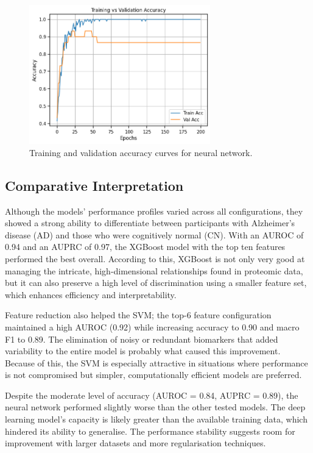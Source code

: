 \documentclass[a4paper,12pt]{article}
\begin{document}
\begin{figure}[H]
\centering
\includegraphics[width=0.70\textwidth]{Pics/nn_training_accuracy.png}
\caption{Training and validation accuracy curves for neural network.}
\label{fig:nn-training}
\end{figure}

\subsection{Comparative Interpretation}
Although the models' performance profiles varied across all configurations, they showed a strong ability to differentiate between participants with Alzheimer's disease (AD) and those who were cognitively normal (CN).  With an AUROC of 0.94 and an AUPRC of 0.97, the XGBoost model with the top ten features performed the best overall.  According to this, XGBoost is not only very good at managing the intricate, high-dimensional relationships found in proteomic data, but it can also preserve a high level of discrimination using a smaller feature set, which enhances efficiency and interpretability.

Feature reduction also helped the SVM; the top-6 feature configuration maintained a high AUROC (0.92) while increasing accuracy to 0.90 and macro F1 to 0.89.  The elimination of noisy or redundant biomarkers that added variability to the entire model is probably what caused this improvement.  Because of this, the SVM is especially attractive in situations where performance is not compromised but simpler, computationally efficient models are preferred.

Despite the moderate level of accuracy (AUROC = 0.84, AUPRC = 0.89), the neural network performed slightly worse than the other tested models. The deep learning model's capacity is likely greater than the available training data, which hindered its ability to generalise. The performance stability suggests room for improvement with larger datasets and more regularisation techniques.
\end{document}
